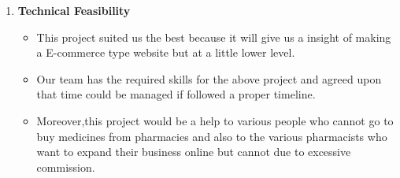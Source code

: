 \documentclass[fleqn,10pt]{../SelfArx} %
\begin{document}
\begin{enumerate}
\item \textbf{Technical Feasibility}
\begin{itemize}
    \item This project suited us the best because it will give us a insight of making a E-commerce type website but at a little lower level.
    \item Our team has the required skills for the above project and agreed upon that time could be managed if followed a proper timeline.
    \item Moreover,this project would be a help to various people who cannot go to buy medicines from pharmacies and also to the various pharmacists who want to expand their business online but cannot due to excessive commission.
\end{itemize}
\end{enumerate}
\end{document}
